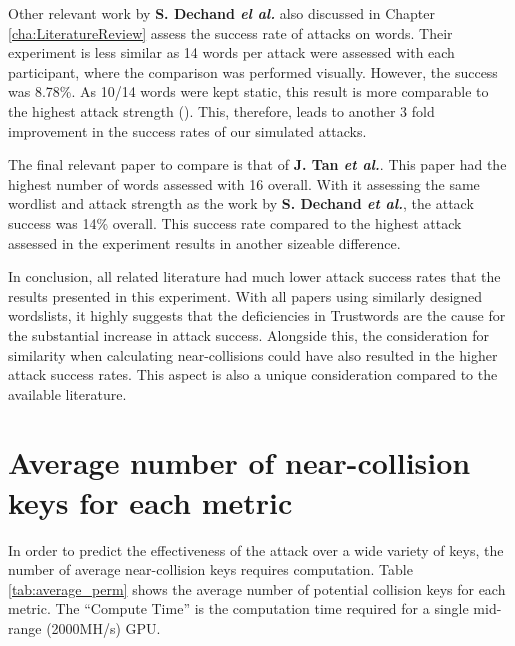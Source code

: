 Other relevant work by \textbf{S. Dechand \textit{el al.}}\cite{dechand2016empirical} also discussed in Chapter \ref{cha:LiteratureReview} assess the success rate of attacks on words. Their experiment is less similar as 14 words per attack were assessed with each participant, where the comparison was performed visually. However, the success was 8.78\%. As 10/14 words were kept static, this result is more comparable to the highest attack strength (\XOOX). This, therefore, leads to another 3 fold improvement in the success rates of our simulated attacks. 

The final relevant paper to compare is that of \textbf{J. Tan \textit{et al.}}\cite{tan2017can}. This paper had the highest number of words assessed with 16 overall. With it assessing the same wordlist and attack strength as the work by \textbf{S. Dechand \textit{et al.}}\cite{dechand2016empirical}, the attack success was 14\% overall. This success rate compared to the highest attack assessed in the experiment results in another sizeable difference.

In conclusion, all related literature had much lower attack success rates that the results presented in this experiment. With all papers using similarly designed wordslists, it highly suggests that the deficiencies in Trustwords are the cause for the substantial increase in attack success. Alongside this, the consideration for similarity when calculating near-collisions could have also resulted in the higher attack success rates. This aspect is also a unique consideration compared to the available literature.

\section{Average number of near-collision keys for each metric}
\label{sec:averagePerms}
In order to predict the effectiveness of the attack over a wide variety of keys, the number of average near-collision keys requires computation. Table \ref{tab:average_perm} shows the average number of potential collision keys for each metric. The ``Compute Time'' is the computation time required for a single mid-range (2000MH/s) GPU.

